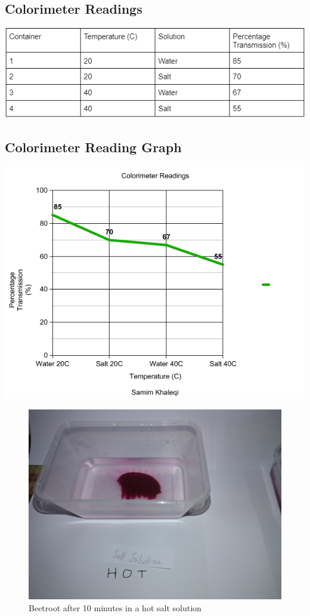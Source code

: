 \documentclass[a4paper,12pt,twoside,english]{all-in-one} %
\begin{document}
\subsection{Colorimeter Readings}
\includegraphics[scale=1]{colourimeter_percentage.png}

\subsection{Colorimeter Reading Graph}
\includegraphics[scale=0.8]{images/colourimeter_graph.png}

\begin{figure}
    \centering
    \includegraphics[scale=0.1]{images/P_0.jpg}
    \caption{Beetroot after 10 minutes in a hot salt solution }
    \label{fig:enter-label}
\end{figure}
\end{document}
